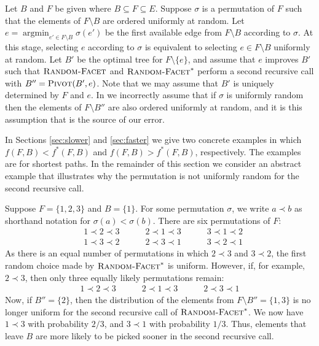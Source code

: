 \documentclass[twoside,11pt]{article}
\newcommand{\PIVOT}{\mbox{\sc Pivot}}
\DeclareMathOperator*{\argmin}{argmin}
\newcommand{\RandomFacet}{\mbox{\sc Random-}\allowbreak\mbox{\sc Facet}}
\begin{document}
Let $B$ and $F$ be given where $B \subseteq F \subseteq E$.
Suppose $\sigma$ is a permutation of $F$ such that the elements of $F\setminus B$ are ordered uniformly at random. Let $e = \argmin_{e' \in F \setminus B} \sigma(e')$ be the first available edge from $F \setminus B$ according to $\sigma$. At this stage, selecting $e$ according to $\sigma$ is equivalent to selecting $e \in F\setminus B$ uniformly at random. Let $B'$ be the optimal tree for $F\setminus \{e\}$, and assume that $e$ improves $B'$ such that $\RandomFacet$ and $\RandomFacet^*$ perform a second recursive call with $B'' = \PIVOT(B',e)$. Note that we may assume that $B'$ is uniquely determined by $F$ and $e$. In \cite{FriedmannHansenZwick/SODA11} we incorrectly assume that if $\sigma$ is uniformly random then the elements of $F\setminus B''$ are also ordered uniformly at random, and it is this assumption that is the source of our error.

In Sections \ref{sec:slower} and \ref{sec:faster} we give two concrete examples in which $f(F,B) < f^*(F,B)$ and $f(F,B) > f^*(F,B)$, respectively. The examples are for shortest paths. In the remainder of this section we consider an abstract example that illustrates why the permutation is not uniformly random for the second recursive call.

Suppose $F = \{1,2,3\}$ and $B = \{1\}$. For some permutation $\sigma$, we write $a \prec b$ as shorthand notation for $\sigma(a) < \sigma(b)$. There are six permutations of $F$:
\begin{align*}
&1 \prec 2 \prec 3 \quad\quad\quad
2 \prec 1 \prec 3 \quad\quad\quad
3 \prec 1 \prec 2\\
&1 \prec 3 \prec 2 \quad\quad\quad
2 \prec 3 \prec 1 \quad\quad\quad
3 \prec 2 \prec 1
\end{align*}
As there is an equal number of permutations in which $2\prec 3$ and $3\prec 2$, the first random choice made by $\RandomFacet^*$ is uniform. However, if, for example, $2\prec 3$, then only three equally likely permutations remain:
\begin{align*}
1 \prec 2 \prec 3\quad\quad\quad
2 \prec 1 \prec 3\quad\quad\quad
2 \prec 3 \prec 1
\end{align*}
Now, if $B'' = \{2\}$, then the distribution of the elements from $F\setminus B'' = \{1,3\}$ is no longer uniform for the second recursive call of $\RandomFacet^*$. We now have $1 \prec 3$ with probability $2/3$, and
$3 \prec 1$ with probability $1/3$. Thus, elements that leave $B$ are more likely to be picked sooner in the second recursive call.
\end{document}
